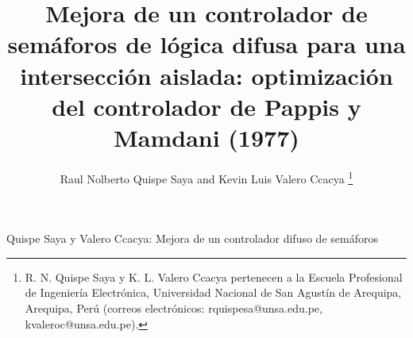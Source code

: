 \documentclass[journal]{IEEEtran}
\begin{document}
\title{Mejora de un controlador de semáforos de lógica difusa para una intersección aislada: optimización del controlador de Pappis y Mamdani (1977)}

\author{Raul Nolberto Quispe Saya and Kevin Luis Valero Ccacya%
\thanks{R. N. Quispe Saya y K. L. Valero Ccacya pertenecen a la Escuela Profesional de Ingeniería Electrónica, Universidad Nacional de San Agustín de Arequipa, Arequipa, Perú (correos electrónicos: rquispesa@unsa.edu.pe, kvaleroc@unsa.edu.pe).}}

%
{Quispe Saya y Valero Ccacya: Mejora de un controlador difuso de semáforos}

\maketitle
\end{document}

